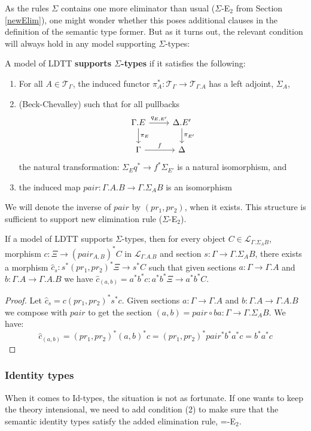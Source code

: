 \documentclass[a4paper,english]{lipics-v2018}
\begin{document}
As the rules $\Sigma$ contains one more eliminator than usual ($\Sigma$-E$_2$ from Section \ref{newElim}), one might wonder whether this poses additional clauses in the definition of the semantic type former. But as it turns out, the relevant condition will always hold in any model supporting $\Sigma$-types:
\begin{definition}A model of LDTT \textbf{supports $\Sigma$-types} if it satisfies the following:
  \begin{enumerate}
  \item For all $A \in \mathcal{T}_{\Gamma}$, the induced functor $\pi_A^* : \mathcal{T}_{\Gamma} \to \mathcal{T}_{\Gamma.A}$ has a left adjoint, $\Sigma_A$,
  \item (Beck-Chevalley) such that for all pullbacks
    \[
    \begin{tikzcd}
     \Gamma.E \ar[d, "\pi_E"] \ar[r, "q_{E, E'}"] & \Delta.E' \ar[d, "\pi_{E'}"] \\
     \Gamma \ar[r, "f"] & \Delta
    \end{tikzcd}
    \] 
    the natural transformation: $\Sigma_Eq^* \to f^*\Sigma_{E'}$ is a natural isomorphism, and
  \item the induced map $pair: \Gamma.A.B \to \Gamma.\Sigma_AB$ is an isomorphism
  \end{enumerate}
\end{definition}
We will denote the inverse of $pair$ by $(pr_1, pr_2)$, when it exists.
This structure is sufficient to support new elimination rule ($\Sigma$-E$_2$).
\begin{theorem}
If a model of LDTT supports $\Sigma$-types, then for every object $C \in \mathcal{L}_{\Gamma.\Sigma_AB}$, morphism $c : \Xi \to (pair_{A,B})^*C$ in $\mathcal{L}_{\Gamma.A.B}$ and section $s : \Gamma \to \Gamma.\Sigma_AB$, there exists a morphism $\hat c_s : s^*(pr_1, pr_2)^*\Xi \to s^*C$ such that given sections $a : \Gamma \to \Gamma.A$ and $b : \Gamma.A \to \Gamma.A.B$ we have $\hat c_{(a, b)} = a^*b^*c : a^*b^*\Xi \to a^*b^*C$.
\begin{proof}
Let $\hat c_s = c(pr_1,pr_2)^*s^*c$. Given sections $a : \Gamma \to \Gamma.A$ and $b : \Gamma.A \to \Gamma.A.B$ we compose with $pair$ to get the section $(a, b) = pair \circ ba : \Gamma \to \Gamma.\Sigma_AB$. We have:
    \[
     \hat c_{(a,b)} = (pr_1,pr_2)^*(a,b)^*c = (pr_1,pr_2)^*pair^*b^*a^*c = b^*a^*c
    \]
  \end{proof}
\end{theorem}
\subsubsection{Identity types}
When it comes to Id-types, the situation is not as fortunate. If one wants to keep the theory intensional, we need to add condition (2) to make sure that the semantic identity types satisfy the added elimination rule, =-E$_2$.
\end{document}
